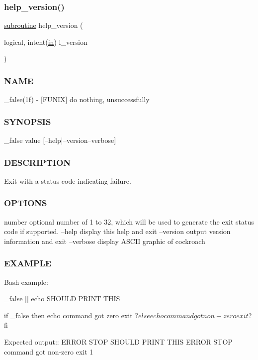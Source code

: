 \subsubsection{\texorpdfstring{help\+\_\+version()}{help\_version()}}
{\footnotesize\ttfamily \hyperlink{M__stopwatch_83_8txt_acfbcff50169d691ff02d4a123ed70482}{subroutine} help\+\_\+version (\begin{DoxyParamCaption}\item[{logical, intent(\hyperlink{M__journal_83_8txt_afce72651d1eed785a2132bee863b2f38}{in})}]{l\+\_\+version }\end{DoxyParamCaption})}



\subsubsection*{N\+A\+ME}

\+\_\+false(1f) -\/ \mbox{[}F\+U\+N\+IX\mbox{]} do nothing, unsuccessfully 

\subsubsection*{S\+Y\+N\+O\+P\+S\+IS}

\begin{DoxyVerb}    _false value [--help|--version--verbose]
\end{DoxyVerb}


\subsubsection*{D\+E\+S\+C\+R\+I\+P\+T\+I\+ON}

Exit with a status code indicating failure. \subsubsection*{O\+P\+T\+I\+O\+NS}

number optional number of 1 to 32, which will be used to generate the exit status code if supported. --help display this help and exit --version output version information and exit --verbose display A\+S\+C\+II graphic of cockroach

\subsubsection*{E\+X\+A\+M\+P\+LE}

\begin{DoxyVerb}   Bash example:

      _false || echo SHOULD PRINT THIS

      if _false
      then
         echo command got zero exit $?
      else
         echo command got non-zero exit $?
      fi

   Expected output::
      ERROR STOP
      SHOULD PRINT THIS
      ERROR STOP
      command got non-zero exit 1
\end{DoxyVerb}


